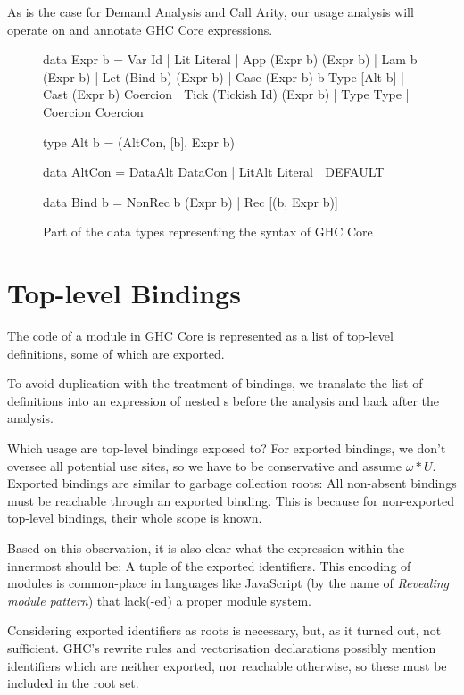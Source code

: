 As is the case for Demand Analysis and Call Arity, our usage analysis will operate on and annotate GHC Core expressions.

\begin{figure}[h]
  \begin{haskellcode}
    data Expr b
      = Var      Id
      | Lit      Literal
      | App      (Expr b) (Expr b)
      | Lam      b (Expr b)
      | Let      (Bind b) (Expr b)
      | Case     (Expr b) b Type [Alt b]
      | Cast     (Expr b) Coercion
      | Tick     (Tickish Id) (Expr b)
      | Type     Type
      | Coercion Coercion

    type Alt b = (AltCon, [b], Expr b)

    data AltCon
      = DataAlt DataCon
      | LitAlt  Literal
      | DEFAULT 

    data Bind b 
      = NonRec b (Expr b)
      | Rec [(b, Expr b)]
  \end{haskellcode}
  \caption{Part of the data types representing the syntax of GHC Core}
  \label{fig:core}
\end{figure}

\section{Top-level Bindings}\label{sec:toplvl}

The code of a module in GHC Core is represented as a list of top-level definitions, some of which are exported.

To avoid duplication with the treatment of  bindings, we translate the list of definitions into an expression of nested s before the analysis and back after the analysis.

Which usage are top-level bindings exposed to? 
For exported bindings, we don't oversee all potential use sites, so we have to be conservative and assume $\omega*U$. 
Exported bindings are similar to garbage collection roots: 
All non-absent bindings must be reachable through an exported binding. 
This is because for non-exported top-level bindings, their whole scope is known.

Based on this observation, it is also clear what the expression within the innermost  should be: A tuple of the exported identifiers.
This encoding of modules is common-place in languages like JavaScript (by the name of \emph{Revealing module pattern}) that lack(-ed) a proper module system.

Considering exported identifiers as roots is necessary, but, as it turned out, not sufficient.
GHC's rewrite rules and vectorisation declarations possibly mention identifiers which are neither exported, nor reachable otherwise, so these must be included in the root set.

